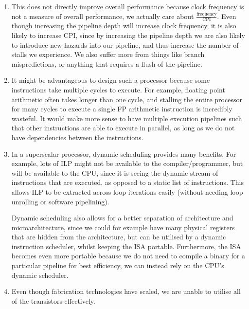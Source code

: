 


\begin{enumerate}[label=(\alph*)]
  \item
    This does not directly improve overall performance because clock frequency is not a measure of overall performance, we actually care about $\frac{\text{frequency}}{\text{CPI}}$. Even though increasing the pipeline depth will increase clock frequency, it is also likely to increase CPI, since by increasing the pipeline depth we are also likely to introduce new hazards into our pipeline, and thus increase the number of stalls we experience. We also suffer more from things like branch mispredictions, or anything that requires a flush of the pipeline.

  \item
    It might be advantageous to design such a processor because some instructions take multiple cycles to execute. For example, floating point arithmetic often takes longer than one cycle, and stalling the entire processor for many cycles to execute a single FP arithmetic instruction is incredibly wasteful. It would make more sense to have multiple execution pipelines such that other instructions are able to execute in parallel, as long as we do not have dependencies between the instructions.

  \item
    In a superscalar processor, dynamic scheduling provides many benefits. For example, lots of ILP might not be available to the compiler/programmer, but will be available to the CPU, since it is seeing the dynamic stream of instructions that are executed, as opposed to a static list of instructions. This allows ILP to be extracted across loop iterations easily (without needing loop unrolling or software pipelining).

    Dynamic scheduling also allows for a better separation of architecture and microarchitecture, since we could for example have many physical registers that are hidden from the architecture, but can be utilised by a dynamic instruction scheduler, whilst keeping the ISA portable. Furthermore, the ISA becomes even more portable because we do not need to compile a binary for a particular pipeline for best efficiency, we can instead rely on the CPU's dynamic scheduler.

  \item
    Even though fabrication technologies have scaled, we are unable to utilise all of the transistors effectively.


\end{enumerate}
